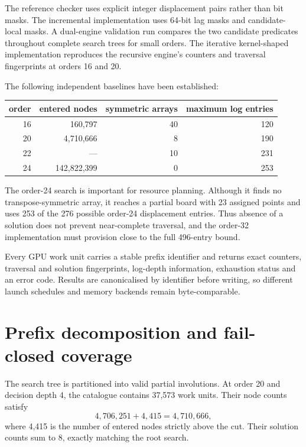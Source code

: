\documentclass[11pt,a4paper]{article}
\begin{document}
The reference checker uses explicit integer displacement pairs rather than bit masks. The incremental implementation uses 64-bit lag masks and candidate-local masks. A dual-engine validation run compares the two candidate predicates throughout complete search trees for small orders. The iterative kernel-shaped implementation reproduces the recursive engine's counters and traversal fingerprints at orders 16 and 20.

The following independent baselines have been established:

\begin{center}
\begin{tabular}{@{}rrrr@{}}
\toprule
order & entered nodes & symmetric arrays & maximum log entries \\
\midrule
16 & 160,797 & 40 & 120 \\
20 & 4,710,666 & 8 & 190 \\
22 & --- & 10 & 231 \\
24 & 142,822,399 & 0 & 253 \\
\bottomrule
\end{tabular}
\end{center}

The order-24 search is important for resource planning. Although it finds no transpose-symmetric array, it reaches a partial board with 23 assigned points and uses 253 of the 276 possible order-24 displacement entries. Thus absence of a solution does not prevent near-complete traversal, and the order-32 implementation must provision close to the full 496-entry bound.

Every GPU work unit carries a stable prefix identifier and returns exact counters, traversal and solution fingerprints, log-depth information, exhaustion status and an error code. Results are canonicalised by identifier before writing, so different launch schedules and memory backends remain byte-comparable.

\section{Prefix decomposition and fail-closed coverage}

The search tree is partitioned into valid partial involutions. At order 20 and decision depth 4, the catalogue contains 37,573 work units. Their node counts satisfy
\[
4,706,251+4,415=4,710,666,
\]
where 4,415 is the number of entered nodes strictly above the cut. Their solution counts sum to 8, exactly matching the root search.
\end{document}
